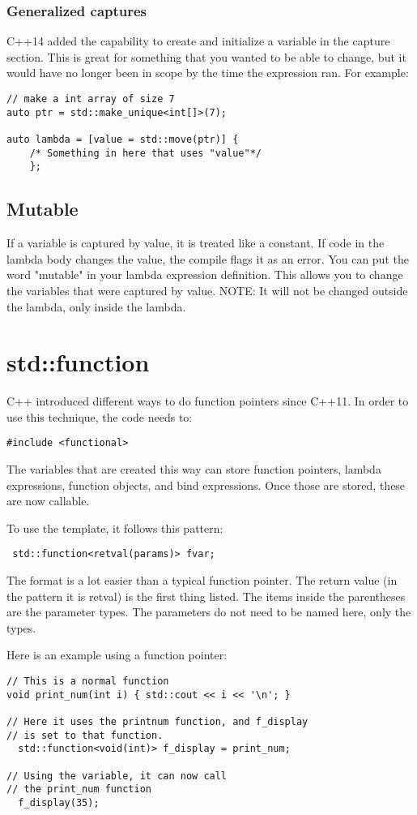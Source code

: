 \subsubsection{Generalized captures}
C++14 added the capability to create and initialize a variable in the capture section. This
is great for something that you wanted to be able to change, but it would have no longer
been in scope by the time the expression ran. For example:

\begin{lstlisting}
// make a int array of size 7
auto ptr = std::make_unique<int[]>(7); 

auto lambda = [value = std::move(ptr)] {
    /* Something in here that uses "value"*/
    };
\end{lstlisting}

\subsection{Mutable}
If a variable is captured by value, it is treated like a constant. If code in the lambda
body changes the value, the compile flags it as an error. You can put the word "mutable"
in your lambda expression definition. This allows you to change the variables that were 
captured by value. NOTE: It will not be changed outside the lambda, only inside the lambda.

\section{std::function}
\label{stdfunction}
C++ introduced different ways to do function pointers since C++11. In order to use this
technique, the code needs to: 
\begin{lstlisting}
#include <functional>
\end{lstlisting}
The variables that are created this way can store function pointers, lambda expressions, 
function objects, and bind expressions. Once those are stored, these are now callable.

To use the template, it follows this pattern:
\begin{verbatim}
 std::function<retval(params)> fvar;    
\end{verbatim}
The format is a lot easier than a typical function pointer. The
return value (in the pattern it is retval) is the first thing listed.
The items inside the parentheses are the parameter types. The parameters
do not need to be named here, only the types.

Here is an example using a function pointer:
\begin{lstlisting}
// This is a normal function
void print_num(int i) { std::cout << i << '\n'; }

// Here it uses the printnum function, and f_display 
// is set to that function.
  std::function<void(int)> f_display = print_num;
  
// Using the variable, it can now call 
// the print_num function
  f_display(35);
\end{lstlisting}

